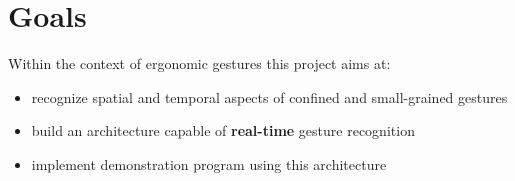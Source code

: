 \section{Goals}
\label{sec:goal}

Within the context of ergonomic gestures this project aims at:
\begin{itemize}
\item recognize spatial and temporal aspects of confined and small-grained gestures
\item build an architecture capable of \textbf{real-time} gesture recognition
\item implement demonstration program using this architecture
\end{itemize}


